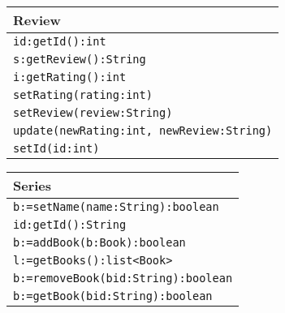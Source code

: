 \documentclass[12pt]{article}
\begin{document}
\begin{tabular}{| l |}
    \hline
    Review\\
    \hline
    \texttt{id:getId():int}\\
    \texttt{s:getReview():String}\\
    \texttt{i:getRating():int}\\
    \texttt{setRating(rating:int)}\\
    \texttt{setReview(review:String)}\\
    \texttt{update(newRating:int, newReview:String)}\\
    \texttt{setId(id:int)}\\
    \hline
\end{tabular}
\vspace{1cm}

\begin{tabular}{| l |}
    \hline
    Series\\
    \hline
    \texttt{b:=setName(name:String):boolean}\\
    \texttt{id:getId():String}\\
    \texttt{b:=addBook(b:Book):boolean}\\
    \texttt{l:=getBooks():list<Book>}\\
    \texttt{b:=removeBook(bid:String):boolean}\\
    \texttt{b:=getBook(bid:String):boolean}\\
    \hline
    
\end{tabular}
\vspace{1cm}
\end{document}
